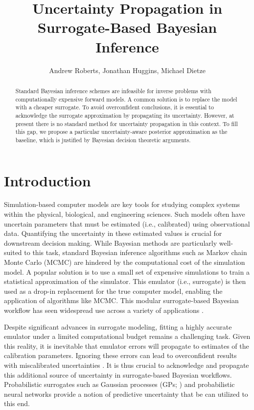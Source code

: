 \documentclass[12pt]{article}
\title{Uncertainty Propagation in Surrogate-Based Bayesian Inference}
\author{Andrew Roberts, Jonathan Huggins, Michael Dietze}
\begin{document}
\maketitle

\begin{abstract}
Standard Bayesian inference schemes are infeasible for inverse problems 
with computationally expensive forward models. A common solution is to 
replace the model with a cheaper surrogate. To avoid overconfident 
conclusions, it is essential to acknowledge the surrogate approximation by propagating 
its uncertainty. However, at present there is no standard method for uncertainty 
propagation in this context. To fill this gap, we propose a particular uncertainty-aware 
posterior approximation as the baseline, which is justified by Bayesian decision theoretic
arguments.  
\end{abstract}

\section{Introduction}
Simulation-based computer models are key tools for studying complex systems within 
the physical, biological, and engineering sciences. Such models often have 
uncertain parameters that must be estimated (i.e., calibrated) using observational data.
Quantifying the uncertainty in these estimated values is crucial for downstream 
decision making. While Bayesian methods are particularly well-suited to this task, 
standard Bayesian inference algorithms such as Markov chain Monte Carlo (MCMC) 
are hindered by the computational cost of the simulation model. A popular solution 
is to use a small set of expensive simulations to train a statistical approximation 
of the simulator. This emulator (i.e., surrogate) is then used as a drop-in replacement 
for the true computer model, enabling the application of algorithms like MCMC. 
This modular surrogate-based Bayesian workflow has seen widespread use across
a variety of applications \citep{FerEmulation,FadikarAgentBased,idealizedGCM,
trainDynamics,FATES_CES,CLMBayesianCalibration}.

Despite significant advances in surrogate modeling, fitting a 
highly accurate emulator under a limited computational budget remains a challenging task.
Given this reality, it is inevitable that emulator errors will propagate to estimates
of the calibration parameters. Ignoring these errors can lead to overconfident results 
with miscalibrated uncertainties \citep{BilionisBayesSurrogates,BurknerSurrogate}.
It is thus crucial to acknowledge and propagate this additional source of uncertainty in 
surrogate-based Bayesian workflows. 
Probabilistic surrogates such as Gaussian processes (GPs; \citet{gpML,gramacy2020surrogates}) 
and probabilistic neural networks \citep{deepEnsembles,BayesOptNN} provide a notion of 
predictive uncertainty that be can utilized to this end.
\end{document}
